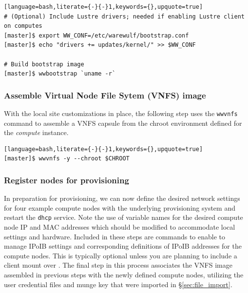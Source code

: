 \documentclass[letterpaper]{article}
\begin{document}
\begin{lstlisting}[language=bash,literate={-}{-}1,keywords={},upquote=true]
# (Optional) Include Lustre drivers; needed if enabling Lustre client on computes
[master]$ export WW_CONF=/etc/warewulf/bootstrap.conf
[master]$ echo "drivers += updates/kernel/" >> $WW_CONF

# Build bootstrap image
[master]$ wwbootstrap `uname -r`
\end{lstlisting}

\subsubsection{Assemble Virtual Node File Sytem (VNFS) image}

With the local site customizations in place, the following step uses the
\texttt{wwvnfs} command to assemble a VNFS capsule from the chroot environment
defined for the {\em compute} instance. 

\begin{lstlisting}[language=bash,literate={-}{-}1,keywords={},upquote=true]
[master]$ wwvnfs -y --chroot $CHROOT
\end{lstlisting}

\subsubsection{Register nodes for provisioning}

In preparation for provisioning, we can now define the desired network settings
for four example compute nodes with the underlying provisioning system and
restart the \texttt{dhcp} service. Note the use of variable names for the
desired compute node IP and MAC addresses which should be modified to
accommodate local settings and hardware. Included in these steps are commands
to enable \Warewulf{} to manage IPoIB settings and corresponding definitions of
IPoIB addresses for the compute nodes. This is typically optional unless you
are planning to include a \Lustre{} client mount over \InfiniBand{}.  The final step
in this process associates the VNFS image assembled in previous steps with the
newly defined compute nodes, utilizing the user credential files and munge key
that were imported in \S\ref{sec:file_import}.

\end{document}
